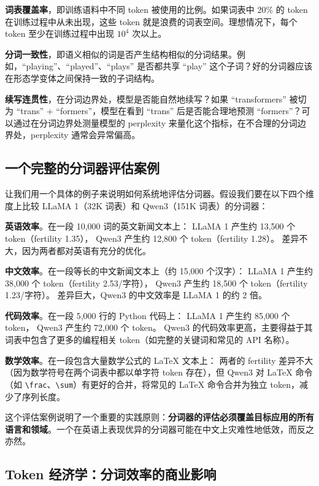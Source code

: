 \textbf{词表覆盖率}，即训练语料中不同 token 被使用的比例。如果词表中 20\% 的 token 在训练过程中从未出现，这些 token 就是浪费的词表空间。理想情况下，每个 token 至少在训练过程中出现 $10^4$ 次以上。

\textbf{分词一致性}，即语义相似的词是否产生结构相似的分词结果。例如，“playing”、“played”、“plays” 是否都共享 “play” 这个子词？好的分词器应该在形态学变体之间保持一致的子词结构。

\textbf{续写连贯性}，在分词边界处，模型是否能自然地续写？如果 “transformers” 被切为 “trans” + “formers”，模型在看到 “trans” 后是否能合理地预测 “formers”？可以通过在分词边界处测量模型的 perplexity 来量化这个指标，在不合理的分词边界处，perplexity 通常会异常偏高。

\subsection{一个完整的分词器评估案例}

让我们用一个具体的例子来说明如何系统地评估分词器。假设我们要在以下四个维度上比较 LLaMA 1（32K 词表）和 Qwen3（151K 词表）的分词器：

\textbf{英语效率}。在一段 10,000 词的英文新闻文本上：
LLaMA 1 产生约 13,500 个 token（fertility 1.35），
Qwen3 产生约 12,800 个 token（fertility 1.28）。
差异不大，因为两者都对英语有充分的优化。

\textbf{中文效率}。在一段等长的中文新闻文本上（约 15,000 个汉字）：
LLaMA 1 产生约 38,000 个 token（fertility 2.53/字符），
Qwen3 产生约 18,500 个 token（fertility 1.23/字符）。
差异巨大，Qwen3 的中文效率是 LLaMA 1 的约 2 倍。

\textbf{代码效率}。在一段 5,000 行的 Python 代码上：
LLaMA 1 产生约 85,000 个 token，
Qwen3 产生约 72,000 个 token。
Qwen3 的代码效率更高，主要得益于其词表中包含了更多的编程相关 token（如完整的关键词和常见的 API 名称）。

\textbf{数学效率}。在一段包含大量数学公式的 LaTeX 文本上：
两者的 fertility 差异不大（因为数学符号在两个词表中都以单字符 token 存在），但 Qwen3 对 LaTeX 命令（如 \texttt{\textbackslash frac}、\texttt{\textbackslash sum}）有更好的合并，将常见的 LaTeX 命令合并为独立 token，减少了序列长度。

这个评估案例说明了一个重要的实践原则：\textbf{分词器的评估必须覆盖目标应用的所有语言和领域}。一个在英语上表现优异的分词器可能在中文上灾难性地低效，而反之亦然。

\subsection{Token 经济学：分词效率的商业影响}

